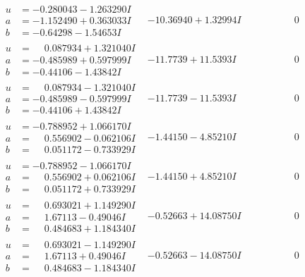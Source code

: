 \documentclass[1p]{elsarticle_modified}
\theoremstyle{definition}
\begin{document}
$$\begin{array}{c|c|c}
\begin{aligned}
u &= -0.280043 - 1.263290 I \\
a &= -1.152490 + 0.363033 I \\
b &= -0.64298 - 1.54653 I\end{aligned}
 & -10.36940 + 1.32994 I & \phantom{-0.000000 } 0 \\ \hline\begin{aligned}
u &= \phantom{-}0.087934 + 1.321040 I \\
a &= -0.485989 + 0.597999 I \\
b &= -0.44106 - 1.43842 I\end{aligned}
 & -11.7739 + 11.5393 I & \phantom{-0.000000 } 0 \\ \hline\begin{aligned}
u &= \phantom{-}0.087934 - 1.321040 I \\
a &= -0.485989 - 0.597999 I \\
b &= -0.44106 + 1.43842 I\end{aligned}
 & -11.7739 - 11.5393 I & \phantom{-0.000000 } 0 \\ \hline\begin{aligned}
u &= -0.788952 + 1.066170 I \\
a &= \phantom{-}0.556902 - 0.062106 I \\
b &= \phantom{-}0.051172 - 0.733929 I\end{aligned}
 & -1.44150 - 4.85210 I & \phantom{-0.000000 } 0 \\ \hline\begin{aligned}
u &= -0.788952 - 1.066170 I \\
a &= \phantom{-}0.556902 + 0.062106 I \\
b &= \phantom{-}0.051172 + 0.733929 I\end{aligned}
 & -1.44150 + 4.85210 I & \phantom{-0.000000 } 0 \\ \hline\begin{aligned}
u &= \phantom{-}0.693021 + 1.149290 I \\
a &= \phantom{-}1.67113 - 0.49046 I \\
b &= \phantom{-}0.484683 + 1.184340 I\end{aligned}
 & -0.52663 + 14.08750 I & \phantom{-0.000000 } 0 \\ \hline\begin{aligned}
u &= \phantom{-}0.693021 - 1.149290 I \\
a &= \phantom{-}1.67113 + 0.49046 I \\
b &= \phantom{-}0.484683 - 1.184340 I\end{aligned}
 & -0.52663 - 14.08750 I & \phantom{-0.000000 } 0\\

\end{array}$$
\end{document}
